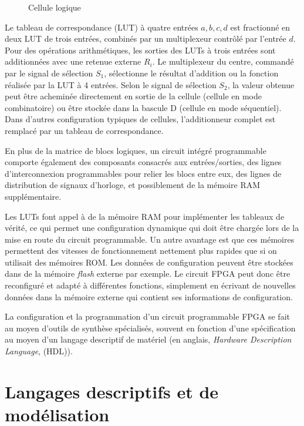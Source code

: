 \documentclass[11pt]{article}
\begin{document}
\begin{figure}[htbp]
\centering

\caption{\label{fig:orgaeb5e7e}Cellule logique}
\end{figure}

Le tableau de correspondance (LUT) à quatre entrées \(a, b, c, d\) est
fractionné en deux LUT de trois entrées, combinés par un multiplexeur
contrôlé par l'entrée \(d\). Pour des opérations arithmétiques, les
sorties des LUTs à trois entrées sont additionnées avec une retenue
externe \(R_i\). Le multiplexeur du centre, commandé par le signal de
sélection \(S_1\), sélectionne le résultat d'addition ou la fonction
réalisée par la LUT à 4 entrées. Selon le signal de sélection \(S_2\),
la valeur obtenue peut être acheminée directement en sortie de la
cellule (cellule en mode combinatoire) ou être stockée dans la bascule
D (cellule en mode séquentiel). Dans d'autres configuration typiques
de cellules, l'additionneur complet est remplacé par un tableau de
correspondance.

En plus de la matrice de blocs logiques, un circuit intégré
programmable comporte également des composants consacrés aux
entrées/sorties, des lignes d'interconnexion programmables pour relier
les blocs entre eux, des lignes de distribution de signaux d'horloge,
et possiblement de la mémoire RAM supplémentaire.

Les LUTs font appel à de la mémoire RAM pour implémenter les tableaux
de vérité, ce qui permet une configuration dynamique qui doit être
chargée lors de la mise en route du circuit programmable. Un autre
avantage est que ces mémoires permettent des vitesses de
fonctionnement nettement plus rapides que si on utilisait des mémoires
ROM.  Les données de configuration peuvent être stockées dans de la
mémoire \emph{flash} externe par exemple. Le circuit FPGA peut donc être
reconfiguré et adapté à différentes fonctions, simplement en écrivant
de nouvelles données dans la mémoire externe qui contient ses
informations de configuration.

La configuration et la programmation d'un circuit programmable FPGA se
fait au moyen d'outils de synthèse spécialisés, souvent en fonction
d'une spécification au moyen d'un langage descriptif de matériel (en
anglais, \emph{Hardware Description Language}, (HDL)).

\section{Langages descriptifs et de modélisation}
\label{sec:org1dfd7c4}
\end{document}
